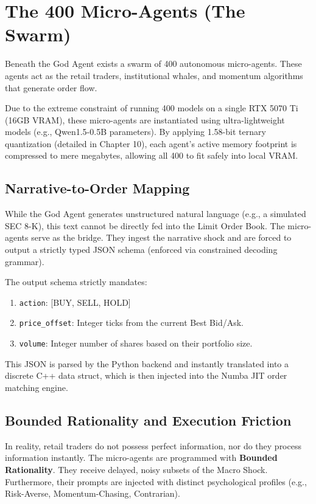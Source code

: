 \section{The 400 Micro-Agents (The Swarm)}

Beneath the God Agent exists a swarm of 400 autonomous micro-agents. These agents act as the retail traders, institutional whales, and momentum algorithms that generate order flow.

Due to the extreme constraint of running 400 models on a single RTX 5070 Ti (16GB VRAM), these micro-agents are instantiated using ultra-lightweight models (e.g., Qwen1.5-0.5B parameters). By applying 1.58-bit ternary quantization (detailed in Chapter 10), each agent's active memory footprint is compressed to mere megabytes, allowing all 400 to fit safely into local VRAM.

\subsection{Narrative-to-Order Mapping}

While the God Agent generates unstructured natural language (e.g., a simulated SEC 8-K), this text cannot be directly fed into the Limit Order Book. The micro-agents serve as the bridge. They ingest the narrative shock and are forced to output a strictly typed JSON schema (enforced via constrained decoding grammar). 

The output schema strictly mandates:
\begin{enumerate}
    \item \texttt{action}: [BUY, SELL, HOLD]
    \item \texttt{price\_offset}: Integer ticks from the current Best Bid/Ask.
    \item \texttt{volume}: Integer number of shares based on their portfolio size.
\end{enumerate}
This JSON is parsed by the Python backend and instantly translated into a discrete C++ data struct, which is then injected into the Numba JIT order matching engine.

\subsection{Bounded Rationality and Execution Friction}

In reality, retail traders do not possess perfect information, nor do they process information instantly. The micro-agents are programmed with \textbf{Bounded Rationality}. They receive delayed, noisy subsets of the Macro Shock. Furthermore, their prompts are injected with distinct psychological profiles (e.g., Risk-Averse, Momentum-Chasing, Contrarian).

